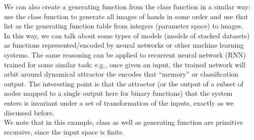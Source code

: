 \documentclass[11pt]{amsart}
\begin{document}
 We can also create a generating function from the class function in a similar way: use the class function to generate all images of hands in some order and use that list as the generating function table from integers (parameter space) to images. \\
 
In this way, we can talk about  some types of models (models of stacked datasets) as functions represented/encoded by  neural networks or other machine learning systems. %
The same reasoning can be applied to  recurrent neural network (RNN) trained for some similar task: e.g., once given an input, the trained network will orbit around dynamical attractor the encodes that ``memory'' or classification output. The interesting point is that the attractor (or the output of a subset of nodes mapped to a single output here for binary functions) that the system enters is invariant under a set of transformation of the inputs, exactly as we discussed before.  \\

We note that  in this example,  class   as well as  generating function are primitive recursive, since the input space is finite.
\end{document}
